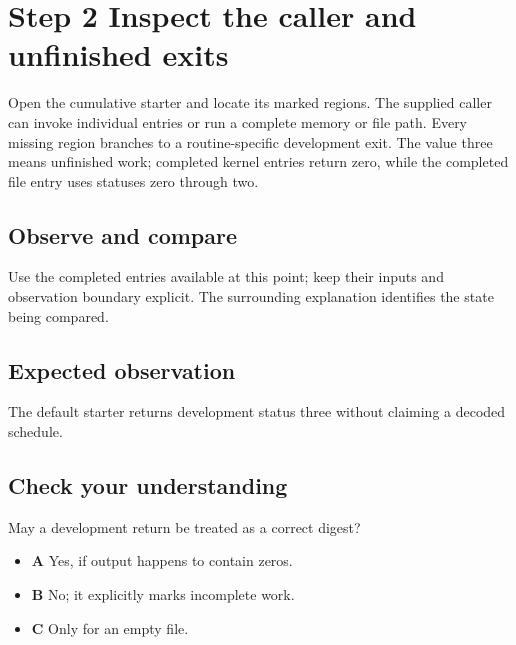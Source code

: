 \section{Step 2 Inspect the caller and unfinished exits}\label{sha-s02}

Open the cumulative starter and locate its marked regions. The supplied caller can invoke individual entries or run a complete memory or file path. Every missing region branches to a routine-specific development exit. The value three means unfinished work; completed kernel entries return zero, while the completed file entry uses statuses zero through two.

\subsection{Observe and compare}
Use the completed entries available at this point; keep their inputs and observation boundary explicit. The surrounding explanation identifies the state being compared.

\subsection{Expected observation}
The default starter returns development status three without claiming a decoded schedule.

\subsection{Check your understanding}
May a development return be treated as a correct digest?

\begin{itemize}
\item \textbf{A} Yes, if output happens to contain zeros.
\item \textbf{B} No; it explicitly marks incomplete work.
\item \textbf{C} Only for an empty file.
\end{itemize}
